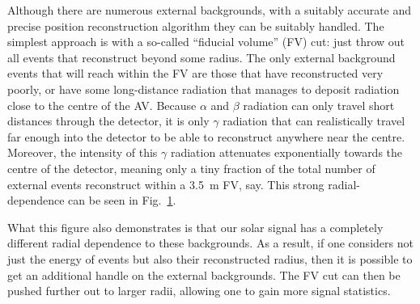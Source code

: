 Although there are numerous external backgrounds, with a suitably accurate and precise position reconstruction algorithm they can be suitably handled. The simplest approach is with a so-called ``fiducial volume'' (FV) cut: just throw out all events that reconstruct beyond some radius. The only external background events that will reach within the FV are those that have reconstructed very poorly, or have some long-distance radiation that manages to deposit radiation close to the centre of the AV. %
Because $\alpha$ and $\beta$ radiation can only travel short distances through the detector, it is only $\gamma$ %
radiation that can realistically travel far enough into the detector to be able to reconstruct anywhere near the centre. Moreover, the intensity of this $\gamma$ radiation attenuates exponentially towards the centre of the detector, meaning only a tiny fraction of the total number of external events reconstruct within a \SI{3.5}{\metre} FV, say. This strong radial-dependence can be seen in Fig.~\ref{fig:external_radial_dependence}.

\begin{figure}
    \centering
    \caption[]{}
    \label{fig:external_radial_dependence}
\end{figure}

What this figure also demonstrates is that our solar signal has a completely different radial dependence to these backgrounds. As a result, if one considers not just the energy of events but also their reconstructed radius, then it is possible to get an additional handle on the external backgrounds. The FV cut can then be pushed further out to larger radii, allowing one to gain more signal statistics.

